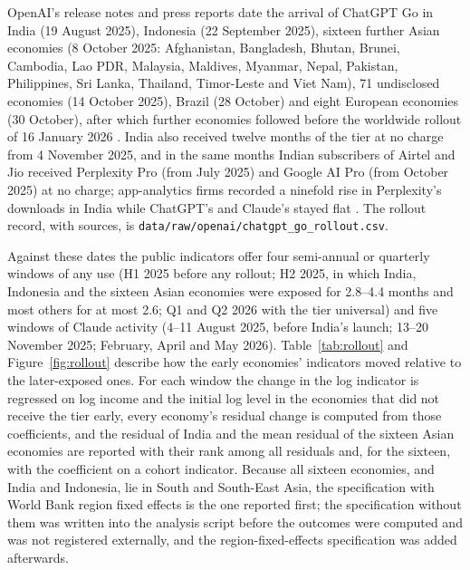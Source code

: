 \documentclass[11pt]{article}
\theoremstyle{definition}
\theoremstyle{remark}
\begin{document}
OpenAI's release notes and press reports date the arrival of ChatGPT Go in India (19 August 2025), Indonesia (22 September 2025), sixteen further Asian economies (8 October 2025: Afghanistan, Bangladesh, Bhutan, Brunei, Cambodia, Lao PDR, Malaysia, Maldives, Myanmar, Nepal, Pakistan, Philippines, Sri Lanka, Thailand, Timor-Leste and Viet Nam), 71 undisclosed economies (14 October 2025), Brazil (28 October) and eight European economies (30 October), after which further economies followed before the worldwide rollout of 16 January 2026 \citep{openai2026go,openai2025gorollout,techcrunch2025go}. India also received twelve months of the tier at no charge from 4 November 2025, and in the same months Indian subscribers of Airtel and Jio received Perplexity Pro (from July 2025) and Google AI Pro (from October 2025) at no charge; app-analytics firms recorded a ninefold rise in Perplexity's downloads in India while ChatGPT's and Claude's stayed flat \citep{techcrunch2026perplexity}. The rollout record, with sources, is \nolinkurl{data/raw/openai/chatgpt_go_rollout.csv}.

Against these dates the public indicators offer four semi-annual or quarterly windows of any use (H1 2025 before any rollout; H2 2025, in which India, Indonesia and the sixteen Asian economies were exposed for 2.8--4.4 months and most others for at most 2.6; Q1 and Q2 2026 with the tier universal) and five windows of Claude activity (4--11 August 2025, before India's launch; 13--20 November 2025; February, April and May 2026). Table~\ref{tab:rollout} and Figure~\ref{fig:rollout} describe how the early economies' indicators moved relative to the later-exposed ones. For each window the change in the log indicator is regressed on log income and the initial log level in the economies that did not receive the tier early, every economy's residual change is computed from those coefficients, and the residual of India and the mean residual of the sixteen Asian economies are reported with their rank among all residuals and, for the sixteen, with the coefficient on a cohort indicator. Because all sixteen economies, and India and Indonesia, lie in South and South-East Asia, the specification with World Bank region fixed effects is the one reported first; the specification without them was written into the analysis script before the outcomes were computed and was not registered externally, and the region-fixed-effects specification was added afterwards.
\end{document}
